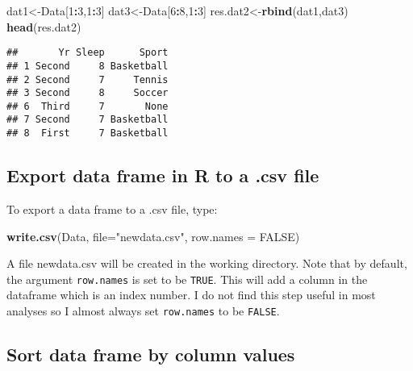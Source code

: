 \documentclass[
]{book}
\newenvironment{Shaded}{\begin{snugshade}}{\end{snugshade}}
\newcommand{\AttributeTok}[1]{\textcolor[rgb]{0.13,0.29,0.53}{#1}}
\newcommand{\ConstantTok}[1]{\textcolor[rgb]{0.56,0.35,0.01}{#1}}
\newcommand{\DecValTok}[1]{\textcolor[rgb]{0.00,0.00,0.81}{#1}}
\newcommand{\FunctionTok}[1]{\textcolor[rgb]{0.13,0.29,0.53}{\textbf{#1}}}
\newcommand{\NormalTok}[1]{#1}
\newcommand{\OtherTok}[1]{\textcolor[rgb]{0.56,0.35,0.01}{#1}}
\newcommand{\SpecialCharTok}[1]{\textcolor[rgb]{0.81,0.36,0.00}{\textbf{#1}}}
\newcommand{\StringTok}[1]{\textcolor[rgb]{0.31,0.60,0.02}{#1}}
\begin{document}
\begin{Shaded}
\begin{Highlighting}[]
\NormalTok{dat1}\OtherTok{\textless{}{-}}\NormalTok{Data[}\DecValTok{1}\SpecialCharTok{:}\DecValTok{3}\NormalTok{,}\DecValTok{1}\SpecialCharTok{:}\DecValTok{3}\NormalTok{]}
\NormalTok{dat3}\OtherTok{\textless{}{-}}\NormalTok{Data[}\DecValTok{6}\SpecialCharTok{:}\DecValTok{8}\NormalTok{,}\DecValTok{1}\SpecialCharTok{:}\DecValTok{3}\NormalTok{]}
\NormalTok{res.dat2}\OtherTok{\textless{}{-}}\FunctionTok{rbind}\NormalTok{(dat1,dat3)}
\FunctionTok{head}\NormalTok{(res.dat2)}
\end{Highlighting}
\end{Shaded}

\begin{verbatim}
##       Yr Sleep      Sport
## 1 Second     8 Basketball
## 2 Second     7     Tennis
## 3 Second     8     Soccer
## 6  Third     7       None
## 7 Second     7 Basketball
## 8  First     7 Basketball
\end{verbatim}

\hypertarget{export-data-frame-in-r-to-a-.csv-file}{%
\subsection{Export data frame in R to a .csv file}\label{export-data-frame-in-r-to-a-.csv-file}}

To export a data frame to a .csv file, type:

\begin{Shaded}
\begin{Highlighting}[]
\FunctionTok{write.csv}\NormalTok{(Data, }\AttributeTok{file=}\StringTok{"newdata.csv"}\NormalTok{, }\AttributeTok{row.names =} \ConstantTok{FALSE}\NormalTok{)}
\end{Highlighting}
\end{Shaded}

A file newdata.csv will be created in the working directory. Note that by default, the argument \texttt{row.names} is set to be \texttt{TRUE}. This will add a column in the dataframe which is an index number. I do not find this step useful in most analyses so I almost always set \texttt{row.names} to be \texttt{FALSE}.

\hypertarget{sort-data-frame-by-column-values}{%
\subsection{Sort data frame by column values}\label{sort-data-frame-by-column-values}}
\end{document}
